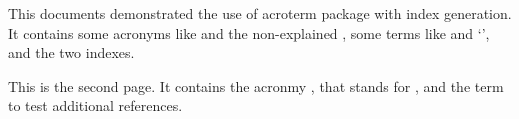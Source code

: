 \documentclass{article}
\begin{document}
\noindent
This documents demonstrated the use of acroterm package with index generation.
It contains some acronyms like  and the
non-explained , some terms like 
and `', and the two indexes.

\printsubindex[idx]
\printsubindex[acronym]

\pagebreak
\noindent
This is the second page. It contains the acronmy , that stands
for , and the term  to test 
additional references.

\end{document}
